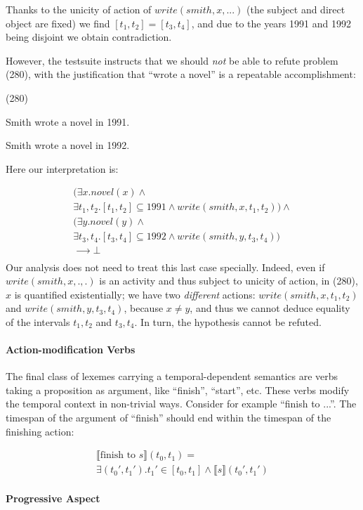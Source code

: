 \documentclass[a4paper,twoside]{article}
\newcommand\hyp{\item[H]}
\newcommand\fracasex[2]{\begin{lingex}\item[(#1)] \begin{subex} #2 \end{subex} \end{lingex} }
\begin{document}
Thanks to the unicity of action of $write(smith,x,...)$ (the subject
and direct object are fixed) we find \([t_1,t_2] = [t_3,t_4]\), and
due to the years 1991 and 1992 being disjoint we obtain contradiction.

However, the testsuite instructs that we should \emph{not} be able to refute
problem (280), with the justification that ``wrote a novel'' is a repeatable
accomplishment:

\fracasex{280}{
\item	Smith wrote a novel in 1991.
\hyp 	Smith wrote a novel in 1992.
}
Here our interpretation is:

\[\begin{array}{l}
(∃x. novel(x) ∧ \\
∃t_1,t_2. [t_1,t_2] ⊆ 1991 ∧ write(smith,x,t_1,t_2)) ∧ \\
(∃y. novel(y) ∧ \\
∃t_3,t_4. [t_3,t_4] ⊆ 1992 ∧ write(smith,y,t_3,t_4)) \\
⟶ ⊥ \\
\end{array}
\]
Our analysis does not need to treat this last case specially. Indeed,
even if $write(smith,x,.,.)$ is an activity and thus subject to
unicity of action, in (280), $x$ is quantified existentially; we have
two \emph{different} actions: $write(smith,x,t_1,t_2)$ and
$write(smith,y,t_3,t_4)$, because $x \neq y$, and thus we cannot
deduce equality of the intervals $t_1,t_2$ and $t_3,t_4$. In turn, the
hypothesis cannot be refuted.

\paragraph{Action-modification Verbs}

The final class of lexemes carrying a temporal-dependent semantics are
verbs taking a proposition as argument, like ``finish'', ``start'',
etc. These verbs modify the temporal context in non-trivial
ways. Consider for example ``finish to ...''. The timespan of the
argument of ``finish'' should end within the timespan of the finishing
action:

\begin{multline*}
⟦\text{finish to \(s\)}⟧(t_0,t_1) = \\ ∃(t_0',t_1'). t_1' ∈ [t_0,t_1] ∧ ⟦s⟧(t_0',t_1')
\end{multline*}

\paragraph{Progressive Aspect}
\end{document}

